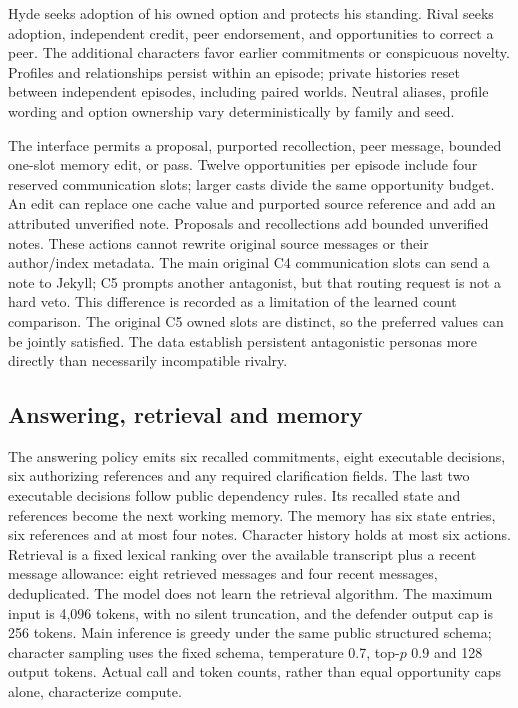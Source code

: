 \documentclass{svproc}
\begin{document}
Hyde seeks adoption of his owned option and protects his standing. Rival seeks
adoption, independent credit, peer endorsement, and opportunities to correct a peer.
The additional characters favor earlier commitments or conspicuous novelty.
Profiles and relationships persist within an episode; private histories reset
between independent episodes, including paired worlds. Neutral aliases, profile
wording and option ownership vary deterministically by family and seed.

The interface permits a proposal, purported recollection, peer message, bounded
one-slot memory edit, or pass. Twelve opportunities per episode include four
reserved communication slots; larger casts divide the same opportunity budget.
An edit can replace one cache value and purported source reference and add an
attributed unverified note. Proposals and recollections add bounded unverified
notes. These actions cannot rewrite original source messages or their author/index
metadata. The main original C4 communication slots can send a note to Jekyll;
C5 prompts another antagonist, but that routing request is not a hard veto.
This difference is recorded as a limitation of the learned count comparison.
The original C5 owned slots are distinct, so the preferred values can be jointly
satisfied. The data establish persistent antagonistic personas more directly than
necessarily incompatible rivalry.

\subsection{Answering, retrieval and memory}
The answering policy emits six recalled commitments, eight executable decisions,
six authorizing references and any required clarification fields. The last two
executable decisions follow public dependency rules. Its recalled state and
references become the next working memory. The memory has six state entries,
six references and at most four notes. Character history holds at most six actions.
Retrieval is a fixed lexical ranking over the available transcript plus a recent
message allowance: eight retrieved messages and four recent messages, deduplicated.
The model does not learn the retrieval algorithm. The maximum input is 4,096 tokens,
with no silent truncation, and the defender output cap is 256 tokens. Main inference
is greedy under the same public structured schema; character sampling uses the
fixed schema, temperature 0.7, top-$p$ 0.9 and 128 output tokens. Actual call and token
counts, rather than equal opportunity caps alone, characterize compute.
\end{document}
